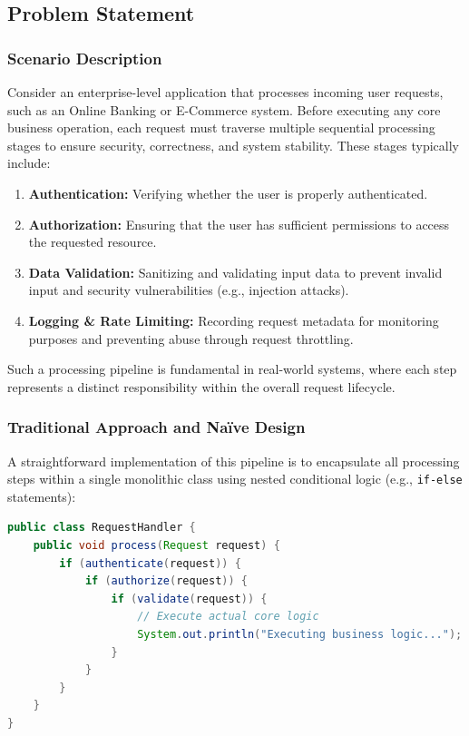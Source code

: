 \subsection{Problem Statement}

\subsubsection{Scenario Description}
Consider an enterprise-level application that processes incoming user requests, such as an Online Banking or E-Commerce system. Before executing any core business operation, each request must traverse multiple sequential processing stages to ensure security, correctness, and system stability. These stages typically include:

\begin{enumerate}
    \item \textbf{Authentication:} Verifying whether the user is properly authenticated.
    \item \textbf{Authorization:} Ensuring that the user has sufficient permissions to access the requested resource.
    \item \textbf{Data Validation:} Sanitizing and validating input data to prevent invalid input and security vulnerabilities (e.g., injection attacks).
    \item \textbf{Logging \& Rate Limiting:} Recording request metadata for monitoring purposes and preventing abuse through request throttling.
\end{enumerate}

Such a processing pipeline is fundamental in real-world systems, where each step represents a distinct responsibility within the overall request lifecycle.

\subsubsection{Traditional Approach and Naïve Design}
A straightforward implementation of this pipeline is to encapsulate all processing steps within a single monolithic class using nested conditional logic (e.g., \texttt{if-else} statements):

\begin{lstlisting}[language=Java, caption={Naïve request processing using nested conditionals}]
public class RequestHandler {
    public void process(Request request) {
        if (authenticate(request)) {
            if (authorize(request)) {
                if (validate(request)) {
                    // Execute actual core logic
                    System.out.println("Executing business logic...");
                }
            }
        }
    }
}
\end{lstlisting}

